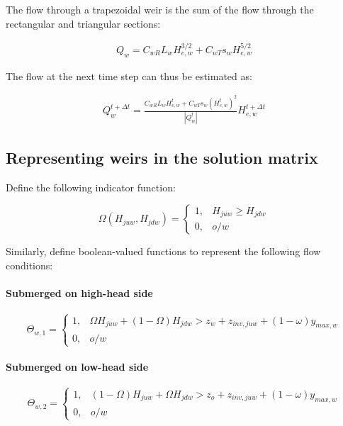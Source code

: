 \documentclass[11pt]{article}
\begin{document}
The flow through a trapezoidal weir is the sum of the flow through the
rectangular and triangular sections:

\begin{align}
  Q_w = C_{wR} L_{w} H_{e,w}^{3/2} + C_{wT} s_{w} H_{e,w}^{5/2}
\end{align}

The flow at the next time step can thus be estimated as:

\begin{align}
  Q_w^{t + \Delta t} = \frac{C_{wR} L_{w} H_{e,w}^t + C_{wT} s_{w} (H_{e,w}^{t})^2}{|Q_{w}^t|} H_{e,w}^{t + \Delta t}
\end{align}

\subsection{Representing weirs in the solution matrix}

Define the following indicator function:

\begin{equation}
  \Omega(H_{juw}, H_{jdw}) = 
  \begin{cases}
    1, & H_{juw} \geq H_{jdw} \\
    0, & o/w
  \end{cases}
\end{equation}

Similarly, define boolean-valued functions to represent the following flow conditions:

\paragraph{Submerged on high-head side}

\begin{equation}
  \Theta_{w,1} =
  \begin{cases}
    1, &   \Omega H_{juw} + (1 - \Omega) H_{jdw} > z_w + z_{inv,juw} + (1 - \omega) y_{max,w} \\
    0, & o/w
  \end{cases}
\end{equation}

\paragraph{Submerged on low-head side}

\begin{equation}
  \Theta_{w,2} =
  \begin{cases}
    1, & (1 - \Omega) H_{juw} + \Omega H_{jdw} > z_o + z_{inv,juw} + (1 - \omega) y_{max,w} \\
    0, & o/w
  \end{cases}
\end{equation}
\end{document}
